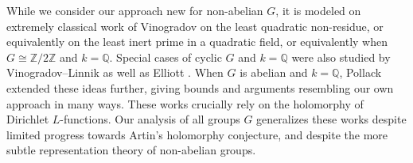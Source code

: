 \documentclass[12pt]{amsart}
\theoremstyle{definition} \newtheorem{definition}[theorem]{Definition}
\theoremstyle{example} \newtheorem{example}[theorem]{Example}
\theoremstyle{remark} \newtheorem{remark}{Remark}[theorem]
\numberwithin{equation}{section}
\numberwithin{theorem}{section}
\begin{document}
	While we consider our approach new for non-abelian $G$, it is modeled on extremely classical work of Vinogradov on the least quadratic non-residue, or equivalently on the least inert prime in a quadratic field, or equivalently when $G \cong \mathbb{Z}/2\mathbb{Z}$ and $k =\mathbb{Q}$.  Special cases of cyclic $G$ and $k =\mathbb{Q}$ were also studied by   Vinogradov--Linnik \cite{VinogradovLinnik-LeastPrimeQuadraticResidue} as well as Elliott \cite{Elliott-LeastPrimePowerResidue}. When $G$ is abelian and $k=\mathbb{Q}$, Pollack \cite{Pollack-PrimeSplittingAbelian} extended these ideas further, giving bounds and arguments resembling our own approach in many ways. These works crucially rely on the holomorphy of Dirichlet $L$-functions. Our analysis of all groups $G$ generalizes these works despite limited progress towards Artin's holomorphy conjecture, and despite the more subtle representation theory of non-abelian groups.
	
\end{document}

